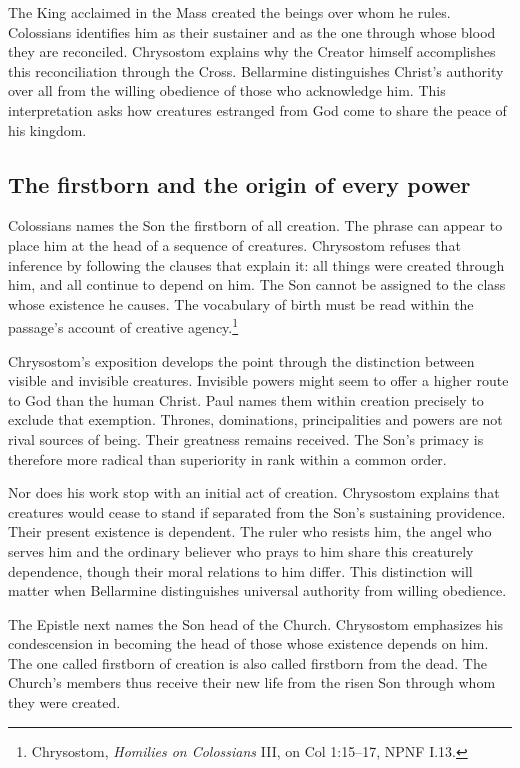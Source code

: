 The King acclaimed in the Mass created the beings over whom he rules. Colossians identifies him as their sustainer and as the one through whose blood they are reconciled. Chrysostom explains why the Creator himself accomplishes this reconciliation through the Cross. Bellarmine distinguishes Christ's authority over all from the willing obedience of those who acknowledge him. This interpretation asks how creatures estranged from God come to share the peace of his kingdom.

\subsection{The firstborn and the origin of every power}
Colossians names the Son the firstborn of all creation. The phrase can appear to place him at the head of a sequence of creatures. Chrysostom refuses that inference by following the clauses that explain it: all things were created through him, and all continue to depend on him. The Son cannot be assigned to the class whose existence he causes. The vocabulary of birth must be read within the passage's account of creative agency.\footnote{Chrysostom, \emph{Homilies on Colossians} III, on Col 1:15--17, NPNF I.13.}

Chrysostom's exposition develops the point through the distinction between visible and invisible creatures. Invisible powers might seem to offer a higher route to God than the human Christ. Paul names them within creation precisely to exclude that exemption. Thrones, dominations, principalities and powers are not rival sources of being. Their greatness remains received. The Son's primacy is therefore more radical than superiority in rank within a common order.

Nor does his work stop with an initial act of creation. Chrysostom explains that creatures would cease to stand if separated from the Son's sustaining providence. Their present existence is dependent. The ruler who resists him, the angel who serves him and the ordinary believer who prays to him share this creaturely dependence, though their moral relations to him differ. This distinction will matter when Bellarmine distinguishes universal authority from willing obedience.

The Epistle next names the Son head of the Church. Chrysostom emphasizes his condescension in becoming the head of those whose existence depends on him. The one called firstborn of creation is also called firstborn from the dead. The Church's members thus receive their new life from the risen Son through whom they were created.

